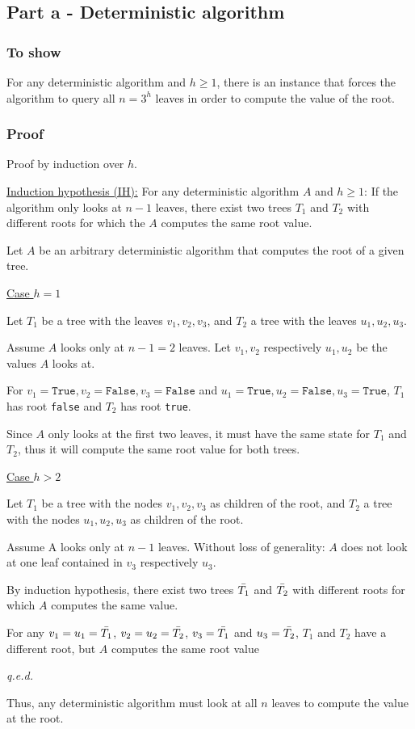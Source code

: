 \subsection*{Part a - Deterministic algorithm}

\subsubsection*{To show}

For any deterministic algorithm and $h \geq 1$, there is an instance that forces the algorithm to query all $n = 3^h$ leaves in order to compute the value of the root.

\subsubsection*{Proof}

Proof by induction over $h$.

\underline{Induction hypothesis (IH):} 
For any deterministic algorithm $A$ and $h \geq 1$: If the algorithm only looks at $n-1$ leaves, there exist two trees $T_1$ and $T_2$ with different roots for which the $A$ computes the same root value.

Let $A$ be an arbitrary deterministic algorithm that computes the root of a given tree.

\underline{Case $h = 1$}

Let $T_1$ be a tree with the leaves $v_1, v_2, v_3$, and $T_2$ a tree with the leaves $u_1, u_2, u_3$.

Assume $A$ looks only at $n - 1 = 2$ leaves. Let $v_1, v_2$ respectively $u_1, u_2$ be the values $A$ looks at. 

For $v_1 = \texttt{True}, v_2 = \texttt{False}, v_3 = \texttt{False}$ and $u_1 = \texttt{True}, u_2 = \texttt{False}, u_3 = \texttt{True}$,
$T_1$ has root \texttt{false} and $T_2$ has root \texttt{true}.

Since $A$ only looks at the first two leaves, it must have the same state for $T_1$ and $T_2$, thus it will compute the same root value for both trees.


\underline{Case $h > 2$}

Let $T_1$ be a tree with the nodes $v_1, v_2, v_3$ as children of the root, and $T_2$ a tree with the nodes $u_1, u_2, u_3$ as children of the root.

Assume A looks only at $n - 1$ leaves. Without loss of generality: $A$ does not look at one leaf contained in $v_3$ respectively $u_3$.

By induction hypothesis, there exist two trees $\Bar{T_1}$ and $\Bar{T_2}$ with different roots for which $A$ computes the same value.

For any $v_1 = u_1 = \Bar{T_1}$, $v_2 = u_2 = \Bar{T_2}$, $v_3 = \Bar{T_1}$ and $u_3 = \Bar{T_2}$, $T_1$ and $T_2$ have a different root, but $A$ computes the same root value

\textit{q.e.d.}

Thus, any deterministic algorithm must look at all $n$ leaves to compute the value at the root.

\pagebreak